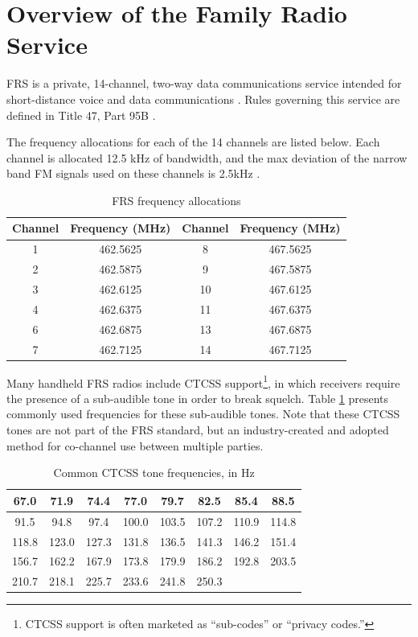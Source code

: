 \cleardoublepage

\section{Overview of the Family Radio Service}

\ac{FRS} is a private, 14-channel, two-way data communications service
intended for short-distance voice and data communications \cite{FCC_FRS}. Rules
governing this service are defined in Title 47, Part 95B \cite{FCC_PART_95B}.

The frequency allocations for each of the 14 channels are listed below. Each
channel is allocated 12.5 kHz of bandwidth, and the max deviation of the
narrow band FM signals used on these channels is 2.5kHz \cite{FCC_PART_95B}.

\begin{table}[h]
  \centering
  \caption{FRS frequency allocations}
  \footnotesize
  \begin{tabular}{|c|c||c|c|}
    \hline
    \textbf{Channel}    & \textbf{Frequency (MHz)} &
    \textbf{Channel}    & \textbf{Frequency (MHz)} \\ \hline
    1 & 462.5625 & 8    & 467.5625 \\ \hline
    2 & 462.5875 & 9    & 467.5875 \\ \hline
    3 & 462.6125 & 10   & 467.6125 \\ \hline
    4 & 462.6375 & 11   & 467.6375 \\ \hline
    6 & 462.6875 & 13   & 467.6875 \\ \hline
    7 & 462.7125 & 14   & 467.7125 \\ \hline
  \end{tabular}
\end{table}

Many handheld \ac{FRS} radios include \ac{CTCSS} support\footnote{CTCSS support
is often marketed as ``sub-codes'' or ``privacy codes.''}, in which receivers
require the presence of a sub-audible tone in order to break squelch. Table
\ref{tab:ctcss}  presents commonly used frequencies for these sub-audible tones.
Note that these CTCSS tones are not part of the FRS standard, but an
industry-created and adopted method for co-channel use between multiple
parties.

\begin{table}[h]
  \centering
  \caption{Common CTCSS tone frequencies, in Hz} \label{tab:ctcss}
  \footnotesize
  \begin{tabular}{|c|c|c|c|c|c|c|c|}
    \hline
    67.0  & 71.9  & 74.4  & 77.0  & 79.7  &  82.5 &  85.4 & 88.5  \\ \hline
    91.5  & 94.8  & 97.4  & 100.0 & 103.5 & 107.2 & 110.9 & 114.8 \\ \hline
    118.8 & 123.0 & 127.3 & 131.8 & 136.5 & 141.3 & 146.2 & 151.4 \\ \hline
    156.7 & 162.2 & 167.9 & 173.8 & 179.9 & 186.2 & 192.8 & 203.5 \\ \hline
    210.7 & 218.1 & 225.7 & 233.6 & 241.8 & 250.3 &       &       \\ \hline
  \end{tabular}
\end{table}

